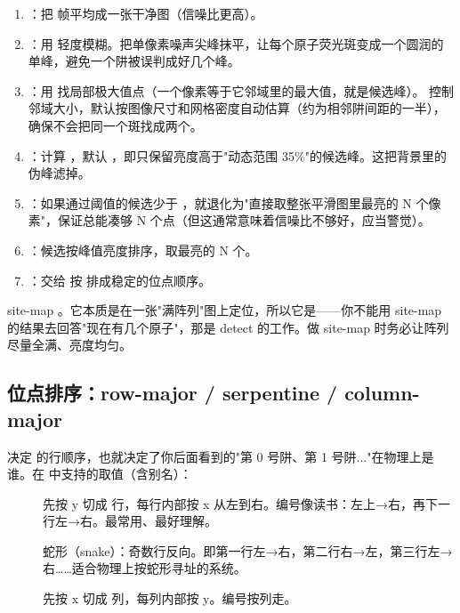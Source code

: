 \documentclass[11pt,oneside,openany]{book}
\begin{document}
\begin{enumerate}
\item {}：把  帧平均成一张干净图（信噪比更高）。
\item {}：用  轻度模糊。把单像素噪声尖峰抹平，让每个原子荧光斑变成一个圆润的单峰，避免一个阱被误判成好几个峰。
\item {}：用  找局部极大值点（一个像素等于它邻域里的最大值，就是候选峰）。 控制邻域大小，默认按图像尺寸和网格密度自动估算（约为相邻阱间距的一半），确保不会把同一个斑找成两个。
\item {}：计算 ，默认 ，即只保留亮度高于"动态范围 35\%"的候选峰。这把背景里的伪峰滤掉。
\item {}：如果通过阈值的候选少于 ，就退化为"直接取整张平滑图里最亮的 N 个像素"，保证总能凑够 N 个点（但这通常意味着信噪比不够好，应当警觉）。
\item {}：候选按峰值亮度排序，取最亮的 N 个。
\item {}：交给  按  排成稳定的位点顺序。
\end{enumerate}

\begin{notebox}[最关键的假设]
site-map 。它本质是在一张"满阵列"图上定位，所以它是——你不能用 site-map 的结果去回答"现在有几个原子"，那是 detect 的工作。做 site-map 时务必让阵列尽量全满、亮度均匀。
\end{notebox}

\subsection{位点排序：row-major / serpentine / column-major}

 决定  的行顺序，也就决定了你后面看到的"第 0 号阱、第 1 号阱..."在物理上是谁。在  中支持的取值（含别名）：

\begin{description}
\item[] 先按 y 切成  行，每行内部按 x 从左到右。编号像读书：左上→右，再下一行左→右。最常用、最好理解。
\item[] 蛇形（snake）：奇数行反向。即第一行左→右，第二行右→左，第三行左→右……适合物理上按蛇形寻址的系统。
\item[] 先按 x 切成  列，每列内部按 y。编号按列走。
\end{description}
\end{document}
